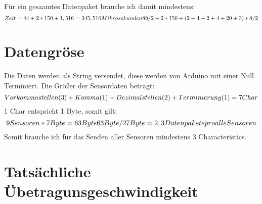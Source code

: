 Für ein gesaamtes Datenpaket brauche ich damit mindestens:
\begin{equation}
    $$
Zeit = 44 + 2*150 + 1,516 = 345,516 Mikrosekunden
88/2 + 2*150 + (2 + 4 + 2 + 4 + 20 + 3)*8/2
$$
\end{equation}

\section{Datengröse}
Die Daten werden als String versendet, diese werden von Arduino mit einer
Null Terminiert. Die Größer der Sensordaten beträgt:
\begin{equation}
    $$
Vorkommastellen (3) + Komma (1) + Dezimalstellen (2) + Terminierung (1) = 7 Char
$$
\end{equation}
1 Char entspricht 1 Byte, somit gilt:
\begin{equation}$$
9 Sensoren * 7 Byte = 63 Byte
63 Byte / 27 Byte = 2,3 Datenpakete pro alle Sensoren
$$
\end{equation}
Somit brauche ich für das Senden aller Sensoren mindestens 3 Characteristics.

\section{Tatsächliche Übetragunsgeschwindigkeit}
